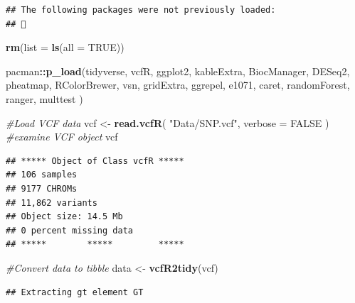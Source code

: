 \documentclass[
]{article}
\newenvironment{Shaded}{\begin{snugshade}}{\end{snugshade}}
\newcommand{\AttributeTok}[1]{\textcolor[rgb]{0.13,0.29,0.53}{#1}}
\newcommand{\CommentTok}[1]{\textcolor[rgb]{0.56,0.35,0.01}{\textit{#1}}}
\newcommand{\ConstantTok}[1]{\textcolor[rgb]{0.56,0.35,0.01}{#1}}
\newcommand{\FunctionTok}[1]{\textcolor[rgb]{0.13,0.29,0.53}{\textbf{#1}}}
\newcommand{\NormalTok}[1]{#1}
\newcommand{\OtherTok}[1]{\textcolor[rgb]{0.56,0.35,0.01}{#1}}
\newcommand{\SpecialCharTok}[1]{\textcolor[rgb]{0.81,0.36,0.00}{\textbf{#1}}}
\newcommand{\StringTok}[1]{\textcolor[rgb]{0.31,0.60,0.02}{#1}}
\begin{document}
\begin{verbatim}
## The following packages were not previously loaded:
## 
\end{verbatim}

\begin{Shaded}
\begin{Highlighting}[]
\FunctionTok{rm}\NormalTok{(}\AttributeTok{list =} \FunctionTok{ls}\NormalTok{(}\AttributeTok{all =} \ConstantTok{TRUE}\NormalTok{))}

\NormalTok{pacman}\SpecialCharTok{::}\FunctionTok{p\_load}\NormalTok{(tidyverse,}
\NormalTok{               vcfR,}
\NormalTok{               ggplot2, }
\NormalTok{               kableExtra,}
\NormalTok{               BiocManager,}
\NormalTok{               DESeq2,}
\NormalTok{               pheatmap,}
\NormalTok{               RColorBrewer,}
\NormalTok{               vsn,}
\NormalTok{               gridExtra,}
\NormalTok{               ggrepel,}
\NormalTok{               e1071,}
\NormalTok{               caret,}
\NormalTok{               randomForest,}
\NormalTok{               ranger,}
\NormalTok{               multtest}
\NormalTok{)}
\end{Highlighting}
\end{Shaded}

\begin{Shaded}
\begin{Highlighting}[]
\CommentTok{\#Load VCF data}
\NormalTok{vcf }\OtherTok{\textless{}{-}} \FunctionTok{read.vcfR}\NormalTok{( }\StringTok{"Data/SNP.vcf"}\NormalTok{, }\AttributeTok{verbose =} \ConstantTok{FALSE}\NormalTok{ )}
\CommentTok{\#examine VCF object}
\NormalTok{vcf}
\end{Highlighting}
\end{Shaded}

\begin{verbatim}
## ***** Object of Class vcfR *****
## 106 samples
## 9177 CHROMs
## 11,862 variants
## Object size: 14.5 Mb
## 0 percent missing data
## *****        *****         *****
\end{verbatim}

\begin{Shaded}
\begin{Highlighting}[]
\CommentTok{\#Convert data to tibble}
\NormalTok{data }\OtherTok{\textless{}{-}} \FunctionTok{vcfR2tidy}\NormalTok{(vcf)}
\end{Highlighting}
\end{Shaded}

\begin{verbatim}
## Extracting gt element GT
\end{verbatim}
\end{document}
